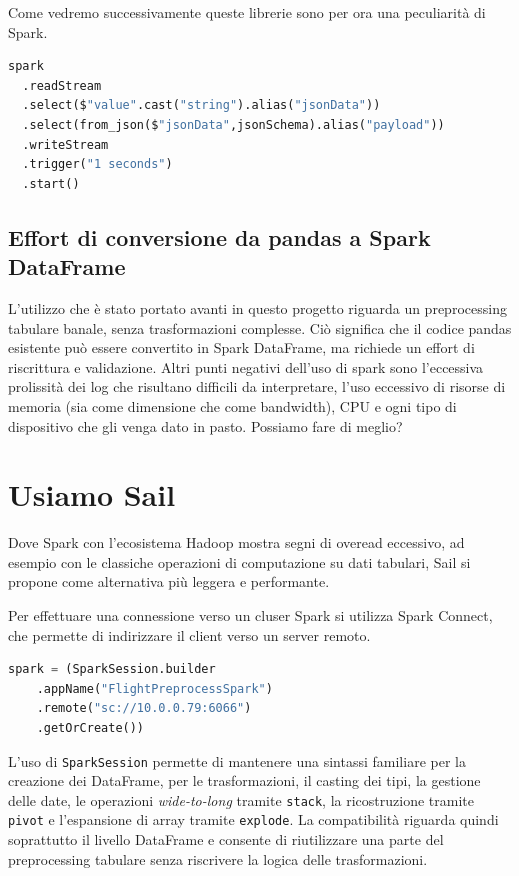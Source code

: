 \documentclass{article}
\begin{document}
Come vedremo successivamente queste librerie sono per ora una peculiarità di Spark. %

\begin{lstlisting}[language=Python]
spark
  .readStream
  .select($"value".cast("string").alias("jsonData"))
  .select(from_json($"jsonData",jsonSchema).alias("payload"))
  .writeStream
  .trigger("1 seconds")
  .start() 
\end{lstlisting}



\subsection{Effort di conversione da pandas a Spark DataFrame}
L'utilizzo che è stato portato avanti in questo progetto riguarda un preprocessing %
tabulare banale, senza trasformazioni complesse. %
Ciò significa che il codice pandas esistente può essere convertito in Spark DataFrame, %
ma richiede un effort di riscrittura e validazione. %
Altri punti negativi dell'uso di spark sono l'eccessiva prolissità dei log che risultano %
difficili da interpretare, l'uso eccessivo di risorse di memoria (sia come dimensione %
che come bandwidth), CPU e ogni tipo di dispositivo che gli venga dato in pasto. %
Possiamo fare di meglio?



\section{Usiamo Sail}

Dove Spark con l'ecosistema Hadoop mostra segni di overead eccessivo, ad esempio con le classiche %
operazioni di computazione su dati tabulari, %
Sail si propone come alternativa più leggera e performante. %

Per effettuare una connessione verso un cluser Spark si utilizza Spark Connect, %
che permette di indirizzare il client verso un server remoto.

\begin{lstlisting}[language=Python]
spark = (SparkSession.builder
    .appName("FlightPreprocessSpark")
    .remote("sc://10.0.0.79:6066")
    .getOrCreate())
\end{lstlisting}



L'uso di \texttt{SparkSession} permette di mantenere una sintassi %
familiare per la creazione dei DataFrame, per le trasformazioni, %
il casting dei tipi, la gestione delle date, le operazioni \emph{wide-to-long} tramite %
\texttt{stack}, la ricostruzione tramite \texttt{pivot} e l'espansione di %
array tramite \texttt{explode}. %
La compatibilità riguarda quindi soprattutto il livello DataFrame %
e consente di riutilizzare una parte del preprocessing tabulare %
senza riscrivere la logica delle trasformazioni.
\end{document}
